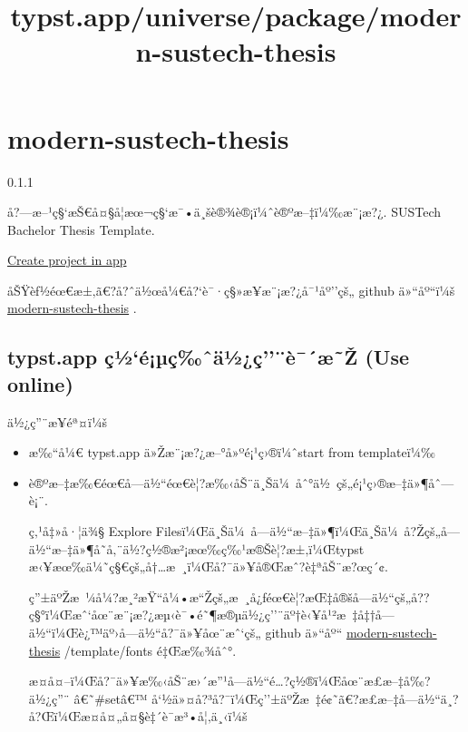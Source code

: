 \title{typst.app/universe/package/modern-sustech-thesis}

\label{banner}
\label{template-thumbnail}

\section{modern-sustech-thesis}\label{modern-sustech-thesis}

{ 0.1.1 }

å?---æ--¹ç§`æŠ€å¤§å­¦æœ¬ç§`æ¯•ä¸šè®¾è®¡ï¼ˆè®ºæ--‡ï¼‰æ¨¡æ?¿. SUSTech
Bachelor Thesis Template.

\href{/app?template=modern-sustech-thesis&version=0.1.1}{Create project
in app}

\label{readme}
åŠŸèƒ½éœ€æ±‚ã€?å?ˆä½œå¼€å?{}`è¯·ç§»æ­¥æ¨¡æ?¿å¯¹åº''çš„ github ä»``åº``ï¼š
\href{https://github.com/Duolei-Wang/modern-sustech-thesis}{modern-sustech-thesis}
.

\subsection{typst.app ç½`é¡µç‰ˆä½¿ç''¨è¯´æ˜Ž (Use
online)}\label{typst.app-uxe7uxbduxe9uxb5uxe7ux2c6uxe4uxbduxe7uxe8uxe6ux17e-use-online}

ä½¿ç''¨æ­¥éª¤ï¼š

\begin{itemize}
\item
  æ‰``å¼€ typst.app ä»Žæ¨¡æ?¿æ--°å»ºé¡¹ç›®ï¼ˆstart from templateï¼‰
\item
  è®ºæ--‡æ‰€éœ€å­---ä½``éœ€è¦?æ‰‹åŠ¨ä¸Šä¼~åˆ°ä½~çš„é¡¹ç›®æ--‡ä»¶åˆ---è¡¨.

  ç‚¹å‡»å·¦ä¾§ Explore
  Filesï¼Œä¸Šä¼~å­---ä½``æ--‡ä»¶ï¼Œä¸Šä¼~å?Žçš„å­---ä½``æ--‡ä»¶å­˜å‚¨ä½?ç½®æ²¡æœ‰ç‰¹æ®Šè¦?æ±‚ï¼Œtypst
  æ‹¥æœ‰ä¼˜ç§€çš„å†\ldots æ~¸ï¼Œå?¯ä»¥å®Œæˆ?è‡ªåŠ¨æ?œç´¢.

  ç''±äºŽæ~¼å¼?æ¸²æŸ``å¼•æ``Žçš„æ~¸å¿ƒéœ€è¦?æŒ‡å®šå­---ä½``çš„å??ç§°ï¼Œæˆ`åœ¨æ¨¡æ?¿æµ‹è¯•é˜¶æ®µä½¿ç''¨äº†è‹¥å¹²æ~‡å‡†å­---ä½``ï¼Œè¿™äº›å­---ä½``å?¯ä»¥åœ¨æˆ`çš„
  github ä»``åº``
  \href{https://github.com/Duolei-Wang/modern-sustech-thesis}{modern-sustech-thesis}
  /template/fonts é‡Œæ‰¾åˆ°.

  æ­¤å¤--ï¼Œå?¯ä»¥æ‰‹åŠ¨æ›´æ''¹å­---ä½``é\ldots?ç½®ï¼Œåœ¨æ­£æ--‡å‰?ä½¿ç''¨
  â€˜\#setâ€™
  å`½ä»¤å?³å?¯ï¼Œç''±äºŽæ~‡é¢˜ã€?æ­£æ--‡å­---ä½``ä¸?å?Œï¼Œæ­¤å¤„å¤§è‡´è¯­æ³•å¦‚ä¸‹ï¼š
\end{itemize}

